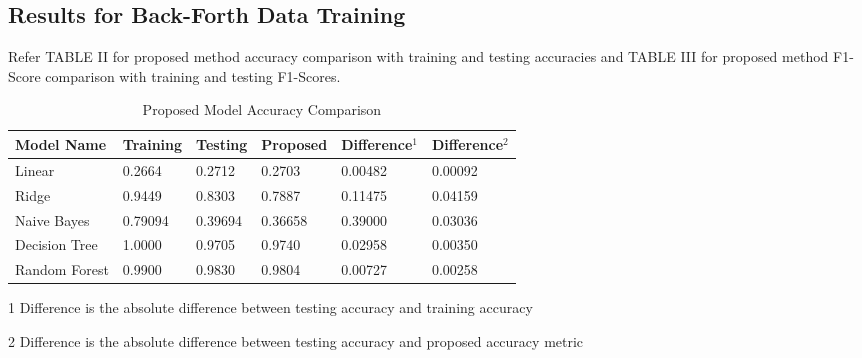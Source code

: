 \documentclass[a4paper,conference]{IEEEtran}
\begin{document}
\subsection{Results for Back-Forth Data Training}
Refer TABLE II for proposed method accuracy comparison with training and testing accuracies
and TABLE III for proposed method F1-Score comparison with training and testing F1-Scores.
\begin{table}[t!]
\renewcommand{\arraystretch}{1.3} 
\caption{Proposed Model Accuracy Comparison}
\centering
\begin{threeparttable}
\begin{tabular}{llllll} %
\bf Model Name & \bf Training & \bf Testing & \bf Proposed & \bf Difference$^1$ & \bf Difference$^2$  \\ \hline 
Linear & 0.2664 & 0.2712 & 0.2703 & 0.00482 &  0.00092\\ 
Ridge  & 0.9449 & 0.8303 & 0.7887 & 0.11475 & 0.04159\\
Naive Bayes  & 0.79094  & 0.39694 & 0.36658 & 0.39000 & 0.03036\\
Decision Tree & 1.0000 & 0.9705 & 0.9740 & 0.02958 & 0.00350\\ 
Random Forest & 0.9900 & 0.9830 & 0.9804 & 0.00727 & 0.00258\\ 
\end{tabular}
\begin{tablenotes}
\item[1]Difference is the absolute difference between testing accuracy and training accuracy
\item[2]Difference is the absolute difference between testing accuracy and proposed accuracy metric
\end{tablenotes}
\end{threeparttable}
\end{table}
\end{document}
